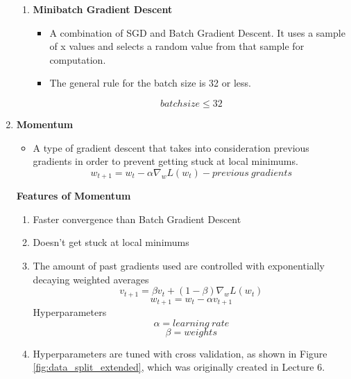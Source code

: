 \begin{enumerate}
\begin{enumerate}
        \item \textbf{Minibatch Gradient Descent}
        \begin{itemize}
            \item A combination of SGD and Batch Gradient Descent. It uses a sample of x values and selects a random value from that sample for computation.
            \item The general rule for the batch size is 32 or less.
        \end{itemize} 
        \[
        batchsize \leq 32
        \]
    \end{enumerate}
    \item \textbf{Momentum}
    \begin{itemize}
        \item  A type of gradient descent that takes into consideration previous gradients in order to prevent getting stuck at local minimums.
        \[
        w_{t+1}=w_t-\alpha \nabla_w L(w_t)-previous\ gradients
        \]
    \end{itemize}
    \textbf{Features of Momentum}
    \begin{enumerate}
        \item Faster convergence than Batch Gradient Descent
        \item Doesn't get stuck at local minimums
        \item The amount of past gradients used are controlled with exponentially decaying weighted averages
        \[
        v_{t+1}=\beta v_t + (1-\beta)\nabla_wL(w_t)
        \]
        \[
        w_{t+1}=w_t-\alpha v_{t+1}
        \]
        Hyperparameters
        \[
        \alpha = learning\ rate
        \]
        \[
        \beta = weights
        \]
        \item Hyperparameters are tuned with cross validation, as shown in Figure \ref{fig:data_split_extended}, which was originally created in Lecture 6.
 \begin{figure}[ht]
    \centering
\end{figure}
\end{enumerate}
\end{enumerate}
